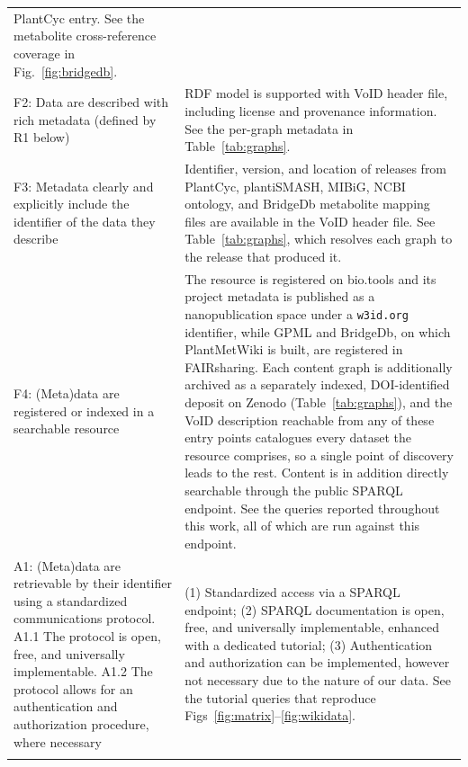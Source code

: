 \documentclass[11pt,a4paper]{article}
\newcommand{\rev}[1]{#1}
\begin{document}
{\begin{longtable}{p{} p{}}
PlantCyc entry.
\rev{See the metabolite cross-reference coverage in Fig.~\ref{fig:bridgedb}.} \\
\addlinespace
F2: Data are described with rich metadata (defined by R1 below) &
RDF model is supported with VoID header file, including license and provenance information.
\rev{See the per-graph metadata in Table~\ref{tab:graphs}.} \\
\addlinespace
F3: Metadata clearly and explicitly include the identifier of the data they describe &
Identifier, version, and location of releases from PlantCyc, plantiSMASH, MIBiG, NCBI ontology, and
BridgeDb metabolite mapping files are available in the VoID header file.
\rev{See Table~\ref{tab:graphs}, which resolves each graph to the release that produced
it.} \\
\addlinespace
F4: (Meta)data are registered or indexed in a searchable resource & The resource is registered on bio.tools and its project
metadata is published as a nanopublication space under a \texttt{w3id.\allowbreak{}org} identifier,
while GPML and BridgeDb, on which PlantMetWiki is built, are registered in FAIRsharing. Each content
graph is additionally archived as a separately indexed, DOI-identified deposit on Zenodo
(Table~\ref{tab:graphs}), and the VoID description reachable from any of these entry points
catalogues every dataset the resource comprises, so a single point of discovery leads to the rest.
Content is in addition directly searchable through the public SPARQL endpoint.
\rev{See the queries reported throughout this work, all of which are run against this endpoint.} \\
\addlinespace
A1: (Meta)data are retrievable by their identifier using a standardized communications protocol.
A1.1 The protocol is open, free, and universally implementable.
A1.2 The protocol allows for an authentication and authorization procedure, where necessary &
(1) Standardized access via a SPARQL endpoint;
(2) SPARQL documentation is open, free, and universally implementable, enhanced with a dedicated
tutorial;
(3) Authentication and authorization can be implemented, however not necessary due to the nature of
our data.
\rev{See the tutorial queries that reproduce Figs~\ref{fig:matrix}--\ref{fig:wikidata}.} \\
\addlinespace

\end{longtable}}
\end{document}
